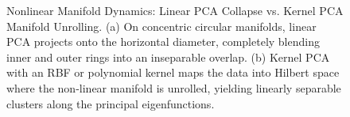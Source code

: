 \begin{figure}[htbp]
\caption{Nonlinear Manifold Dynamics: Linear PCA Collapse vs. Kernel PCA Manifold Unrolling. (a) On concentric circular manifolds, linear PCA projects onto the horizontal diameter, completely blending inner and outer rings into an inseparable overlap. (b) Kernel PCA with an RBF or polynomial kernel maps the data into Hilbert space where the non-linear manifold is unrolled, yielding linearly separable clusters along the principal eigenfunctions.}
\label{fig:kpca_manifold_unrolling}
\end{figure}

